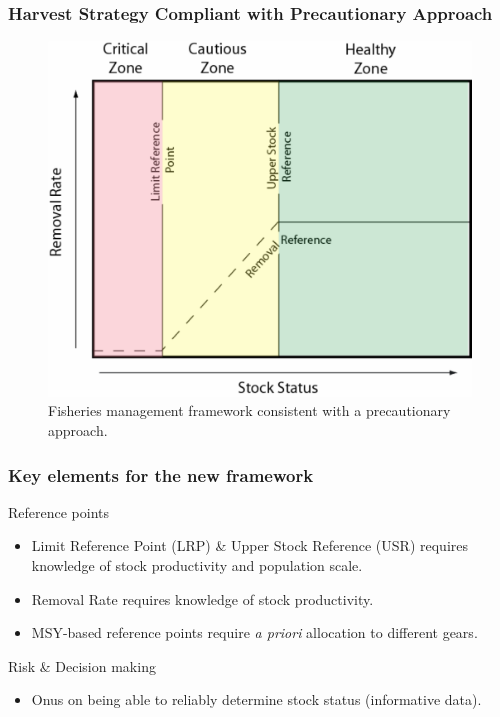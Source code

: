 %
\begin{frame}
	\frametitle{Harvest Strategy Compliant with Precautionary Approach} 
	\begin{figure}
		[htbp] \centering 
		\includegraphics[width=0.7
		\textwidth]{SSF} \caption{Fisheries management framework consistent with a precautionary approach.} \label{fig:label} 
	\end{figure}
\end{frame}

%
\begin{frame}[allowframebreaks]
	\frametitle{Key elements for the new framework} 
	\begin{block}
		{Reference points} 
		\begin{itemize}
			\item Limit Reference Point (LRP) \& Upper Stock Reference (USR) requires knowledge of stock productivity and population scale. 
			\item Removal Rate requires knowledge of stock productivity. 
			\item MSY-based reference points require \textit{a priori} allocation to different gears. 
		\end{itemize}
	\end{block}
	\begin{block}
		{Risk \& Decision making} 
		\begin{itemize}
			\item Onus on being able to reliably determine stock status (informative data). 
		\end{itemize}
	\end{block}
\end{frame}

